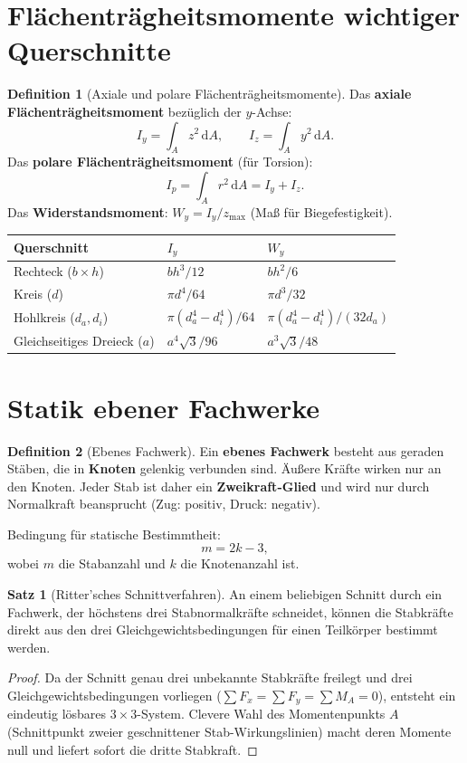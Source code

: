 ﻿\documentclass[a4paper,12pt]{report}
\theoremstyle{definition}
\newtheorem{definition}{Definition}
\newtheorem{satz}{Satz}
\begin{document}
\section{Fl\"achentr\"agheitsmomente wichtiger Querschnitte}

\begin{definition}[Axiale und polare Fl\"achentr\"agheitsmomente]
Das \textbf{axiale Fl\"achentr\"agheitsmoment} bez\"uglich der $y$-Achse:
\[
  I_y = \int_A z^2\,\mathrm{d}A, \qquad I_z = \int_A y^2\,\mathrm{d}A.
\]
Das \textbf{polare Fl\"achentr\"agheitsmoment} (f\"ur Torsion):
\[
  I_p = \int_A r^2\,\mathrm{d}A = I_y + I_z.
\]
Das \textbf{Widerstandsmoment}: $W_y = I_y / z_{\max}$ (Ma\ss{} f\"ur Biegefestigkeit).
\end{definition}

\begin{center}
\begin{tabular}{lll}
\toprule
Querschnitt & $I_y$ & $W_y$ \\
\midrule
Rechteck ($b \times h$) & $bh^3/12$ & $bh^2/6$ \\
Kreis ($d$) & $\pi d^4/64$ & $\pi d^3/32$ \\
Hohlkreis ($d_a, d_i$) & $\pi(d_a^4 - d_i^4)/64$ & $\pi(d_a^4-d_i^4)/(32 d_a)$ \\
Gleichseitiges Dreieck ($a$) & $a^4\sqrt{3}/96$ & $a^3\sqrt{3}/48$ \\
\bottomrule
\end{tabular}
\end{center}

\section{Statik ebener Fachwerke}

\begin{definition}[Ebenes Fachwerk]
Ein \textbf{ebenes Fachwerk} besteht aus geraden St\"aben, die in
\textbf{Knoten} gelenkig verbunden sind. \"Au\ss{}ere Kr\"afte wirken
nur an den Knoten. Jeder Stab ist daher ein \textbf{Zweikraft-Glied}
und wird nur durch Normalkraft beansprucht (Zug: positiv, Druck: negativ).

Bedingung f\"ur statische Bestimmtheit:
\[
  m = 2k - 3,
\]
wobei $m$ die Stabanzahl und $k$ die Knotenanzahl ist.
\end{definition}

\begin{satz}[Ritter'sches Schnittverfahren]
An einem beliebigen Schnitt durch ein Fachwerk, der h\"ochstens drei
Stabnormalkr\"afte schneidet, k\"onnen die Stabkr\"afte direkt aus
den drei Gleichgewichtsbedingungen f\"ur einen Teilk\"orper bestimmt werden.
\end{satz}
\begin{proof}
Da der Schnitt genau drei unbekannte Stabkr\"afte freilegt und drei
Gleichgewichtsbedingungen vorliegen ($\sum F_x = \sum F_y = \sum M_A = 0$),
entsteht ein eindeutig l\"osbares $3\times 3$-System.
Clevere Wahl des Momentenpunkts $A$ (Schnittpunkt zweier geschnittener Stab-Wirkungslinien)
macht deren Momente null und liefert sofort die dritte Stabkraft.
\end{proof}
\end{document}
